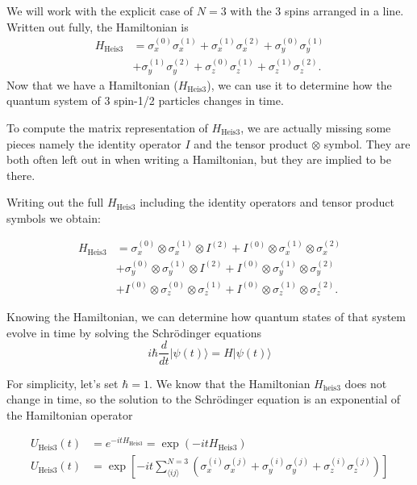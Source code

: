     We will work with the explicit case of $N=3$ with the 3 spins arranged in a line. Written out fully, the Hamiltonian is
\begin{equation}
\begin{split}
H_{\text{Heis3}} &= \sigma_x^{(0)}\sigma_x^{(1)} + \sigma_x^{(1)}\sigma_x^{(2)} + \sigma_y^{(0)}\sigma_y^{(1)} \\
&+ \sigma_y^{(1)}\sigma_y^{(2)} + \sigma_z^{(0)}\sigma_z^{(1)} + \sigma_z^{(1)}\sigma_z^{(2)}.
\end{split}
\end{equation}
Now that we have a Hamiltonian ($H_{\text{Heis3}}$), we can use it to determine how the quantum system of 3 spin-1/2 particles changes in time.


To compute the matrix representation of $H_{\text{Heis3}}$, we are actually missing some pieces namely the identity operator $I$ and the tensor product $\otimes$ symbol. They are both often left out in when writing a Hamiltonian, but they are implied to be there. 

Writing out the full $H_{\text{Heis3}}$ including the identity operators and tensor product symbols we obtain: 

\begin{equation}
    \begin{split}
H_{\text{Heis3}} &= \sigma_x^{(0)}\otimes\sigma_x^{(1)}\otimes I^{(2)} + I^{(0)} \otimes\sigma_x^{(1)}\otimes\sigma_x^{(2)} \\ &+ \sigma_y^{(0)}\otimes\sigma_y^{(1)}\otimes I^{(2)} + 
I^{(0)} \otimes \sigma_y^{(1)}\otimes\sigma_y^{(2)} \\ &+ I^{(0)} \otimes\sigma_z^{(0)}\otimes\sigma_z^{(1)} + I^{(0)}\otimes\sigma_z^{(1)}\otimes\sigma_z^{(2)}.
\end{split}
\end{equation}


Knowing the Hamiltonian, we can determine how quantum states of that system evolve in time by solving the Schrödinger equations
\begin{equation}
i\hbar \dfrac{d}{dt}|\psi(t)\rangle = H |\psi(t)\rangle
\end{equation}

For simplicity, let's set $\hbar = 1$. We know that the Hamiltonian $H_{\text{heis3}}$ does not change in time, so the solution to the Schrödinger equation is an exponential of the Hamiltonian operator

\begin{align}
U_{\text{Heis3}}(t) &= e^{-it H_\text{Heis3}} = \exp\left(-it H_\text{Heis3}\right) \\
U_{\text{Heis3}}(t) &= \exp\left[-it \sum_{\langle ij \rangle}^{N=3} \left(\sigma_x^{(i)}\sigma_x^{(j)} + \sigma_y^{(i)}\sigma_y^{(j)} + \sigma_z^{(i)}\sigma_z^{(j)}\right) \right]
\end{align}




